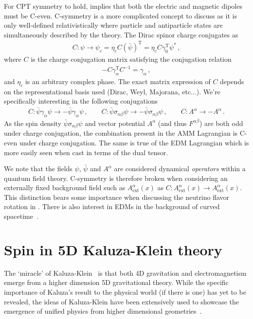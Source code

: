 For CPT symmetry to hold,  implies that both the electric and magnetic dipoles must be C-even. C-symmetry is a more complicated concept to discuss as it is only well-defined relativistically where particle and antiparticle states are simultaneously described by the theory. The Dirac spinor charge conjugates as
\begin{align}
    \label{c:1}
    C:\psi\rightarrow\psi_{c}=\eta_{c}C(\bar\psi)^\mathrm{T}= \eta_{c}C\gamma_{0}^\mathrm{T}\psi^{*}\,,
\end{align}
where $C$ is the charge conjugation matrix satisfying the conjugation relation
\begin{align}
    \label{c:2}
    -C\gamma_{\alpha}^\mathrm{T}C^{-1}=\gamma_{\alpha}\,,
\end{align}
and $\eta_{c}$ is an arbitrary complex phase. The exact matrix expression of $C$ depends on the representational basis used (Dirac, Weyl, Majorana, etc...). We're specifically interesting in the following conjugations
\begin{align}
    \label{c:3}
    C:\bar\psi\gamma_{\alpha}\psi\rightarrow-\bar\psi\gamma_{\alpha}\psi\,,\qquad
    C:\bar\psi\sigma_{\alpha\beta}\psi\rightarrow-\bar\psi\sigma_{\alpha\beta}\psi\,,\qquad
    C:A^{\alpha}\rightarrow-A^{\alpha}\,.
\end{align}
As the spin density $\bar\psi\sigma_{\alpha\beta}\psi$ and vector potential $A^{\alpha}$ (and thus $F^{\alpha\beta}$) are both odd under charge conjugation, the combination present in the AMM Lagrangian  is C-even under charge conjugation. The same is true of the EDM Lagrangian  which is more easily seen when cast in terms of the dual tensor.

We note that the fields $\psi$, $\bar\psi$ and $A^{\alpha}$ are considered dynamical \emph{operators} within a quantum field theory. C-symmetry is therefore broken when considering an externally fixed background field such as $A_\mathrm{ext}^{\alpha}(x)$ as $C:A_\mathrm{ext}^{\alpha}(x)\rightarrow A_\mathrm{ext}^{\alpha}(x)$. This distinction bears some importance when discussing the neutrino flavor rotation in . There is also interest in EDMs in the background of curved spacetime~\citep{Filho:2023lqe}.

\section{Spin in 5D Kaluza-Klein theory}
\label{sec:kk}
The `miracle' of Kaluza-Klein~\citep{Kaluza:1921tu,Klein:1926tv} is that both 4D gravitation and electromagnetism emerge from a higher dimension 5D gravitational theory. While the specific importance of Kaluza's result to the physical world (if there is one) has yet to be revealed, the ideas of Kaluza-Klein have been extensively used to showcase the emergence of unified physics from higher dimensional geometries~\citep{Ortin:2015hya}.

